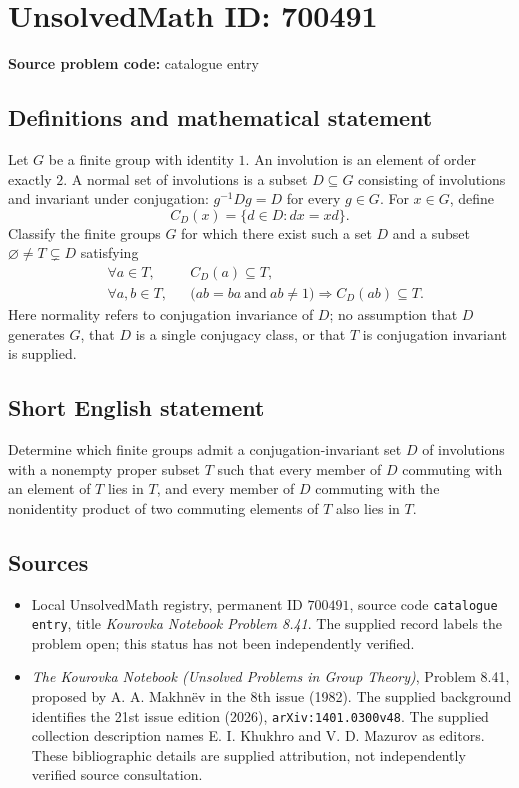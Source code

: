 \documentclass[11pt]{article}
\begin{document}
\section*{UnsolvedMath ID: 700491}
\textbf{Source problem code:} catalogue entry
\subsection{Definitions and mathematical statement}
Let \(G\) be a finite group with identity \(1\). An involution is an element of order exactly \(2\). A normal set of involutions is a subset \(D\subseteq G\) consisting of involutions and invariant under conjugation: \(g^{-1}Dg=D\) for every \(g\in G\). For \(x\in G\), define
\[
C_D(x)=\{d\in D:dx=xd\}.
\]
Classify the finite groups \(G\) for which there exist such a set \(D\) and a subset \(\varnothing\ne T\subsetneq D\) satisfying
\[
\begin{aligned}
&\forall a\in T, &&C_D(a)\subseteq T,\\
&\forall a,b\in T, &&\bigl(ab=ba\ \text{and}\ ab\ne1\bigr)\Longrightarrow C_D(ab)\subseteq T.
\end{aligned}
\]
Here normality refers to conjugation invariance of \(D\); no assumption that \(D\) generates \(G\), that \(D\) is a single conjugacy class, or that \(T\) is conjugation invariant is supplied.
\subsection{Short English statement}
Determine which finite groups admit a conjugation-invariant set \(D\) of involutions with a nonempty proper subset \(T\) such that every member of \(D\) commuting with an element of \(T\) lies in \(T\), and every member of \(D\) commuting with the nonidentity product of two commuting elements of \(T\) also lies in \(T\).
\subsection{Sources}
\begin{itemize}
\item Local UnsolvedMath registry, permanent ID \(700491\), source code \texttt{catalogue entry}, title \emph{Kourovka Notebook Problem 8.41}. The supplied record labels the problem open; this status has not been independently verified.
\item \emph{The Kourovka Notebook (Unsolved Problems in Group Theory)}, Problem 8.41, proposed by A. A. Makhn\"ev in the 8th issue (1982). The supplied background identifies the 21st issue edition (2026), \texttt{arXiv:1401.0300v48}. The supplied collection description names E. I. Khukhro and V. D. Mazurov as editors. These bibliographic details are supplied attribution, not independently verified source consultation.
\end{itemize}
\end{document}
